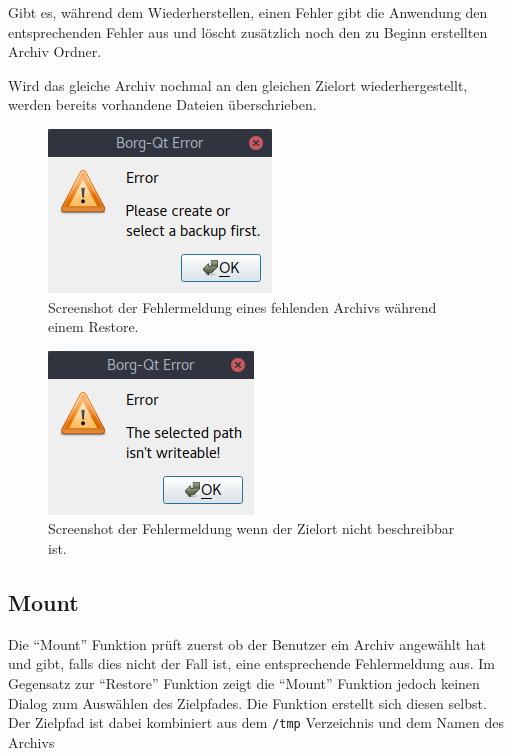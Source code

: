 Gibt es, während dem Wiederherstellen, einen Fehler gibt die Anwendung den
entsprechenden Fehler aus und löscht zusätzlich noch den zu Beginn erstellten
Archiv Ordner.

Wird das gleiche Archiv nochmal an den gleichen Zielort wiederhergestellt,
werden bereits vorhandene Dateien überschrieben.

\begin{figure}
\centering
\includegraphics[width=.2\paperwidth]{pictures/borgqt_no_archive_selected.png}
\caption{\label{fig:org40b5f27}
Screenshot der Fehlermeldung eines fehlenden Archivs während einem Restore.}
\end{figure}

\begin{figure}
\centering
\includegraphics[width=.2\paperwidth]{pictures/borgqt_not_writeable.png}
\caption{\label{fig:org49c2dc3}
Screenshot der Fehlermeldung wenn der Zielort nicht beschreibbar ist.}
\end{figure}

\newpage
\subsection{Mount}
\label{sec:orgb1a6a89}

Die "`Mount"' Funktion prüft zuerst ob der Benutzer ein Archiv angewählt hat und
gibt, falls dies nicht der Fall ist, eine entsprechende Fehlermeldung aus. Im
Gegensatz zur "`Restore"' Funktion zeigt die "`Mount"' Funktion jedoch keinen
Dialog zum Auswählen des Zielpfades. Die Funktion erstellt sich diesen selbst.
Der Zielpfad ist dabei kombiniert aus dem \texttt{/tmp} Verzeichnis und dem Namen des
Archivs

